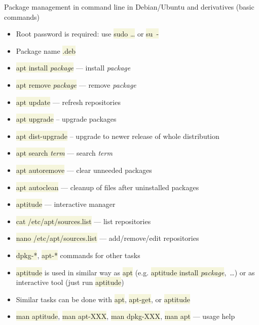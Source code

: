 \documentclass[compress, xelatex, 11pt, xcolor=svgnames, aspectratio=169, url={hyphens, lowtilde}]{beamer}
\renewcommand{\texttt}[1]{\colorbox{Beige}{{\ttfamily #1}}}
\begin{document}
\begin{frame}[allowframebreaks]{Package management in command line in Debian/Ubuntu and derivatives (basic commands)}
	\begin{itemize}
		\item Root password is required: use \texttt{sudo \ldots} or \texttt{su~-}
		\item Package name \texttt{*.deb}
		\item \texttt{apt install \textit{package}} --- install \textit{package}
		\item \texttt{apt remove \textit{package}} --- remove \textit{package}
		\item \texttt{apt update} --- refresh repositories
		\item \texttt{apt upgrade} -- upgrade packages
		\item \texttt{apt dist-upgrade} -- upgrade to newer release of whole distribution
		\item \texttt{apt search \textit{term}} --- search \textit{term}
		\item \texttt{apt autoremove} --- clear unneeded packages
		\item \texttt{apt autoclean} --- cleanup of files after uninstalled packages
		\item \texttt{aptitude} --- interactive manager
		\item \texttt{cat /etc/apt/sources.list} --- list repositories
		\item \texttt{nano /etc/apt/sources.list} --- add/remove/edit repositories
		\item \texttt{dpkg-*}, \texttt{apt-*} commands for other tasks
		\item \texttt{aptitude} is used in similar way as \texttt{apt} (e.g. \texttt{aptitude install \textit{package}},~\ldots) or as interactive tool (just run \texttt{aptitude})
		\item Similar tasks can be done with \texttt{apt}, \texttt{apt-get}, or \texttt{aptitude}
		\item \texttt{man aptitude}, \texttt{man apt-XXX}, \texttt{man dpkg-XXX}, \texttt{man apt} --- usage help
	\end{itemize}
\end{frame}
\end{document}
